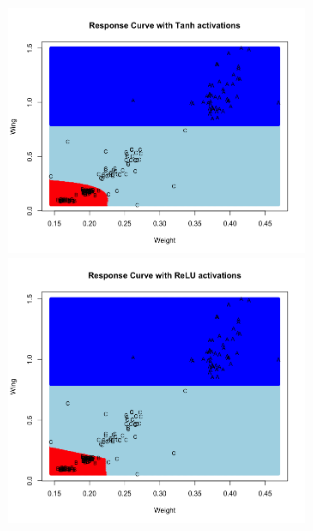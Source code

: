 \documentclass[12pt]{article}
\begin{document}
\subsubsection{}
\begin{figure}[!ht]
\centering
\includegraphics[width=0.7\textwidth]{question_f_plot_A.png}
\includegraphics[width=0.7\textwidth]{question_f_plot_B.png}
\end{figure}



\newpage
\appendix
{}
\end{document}
